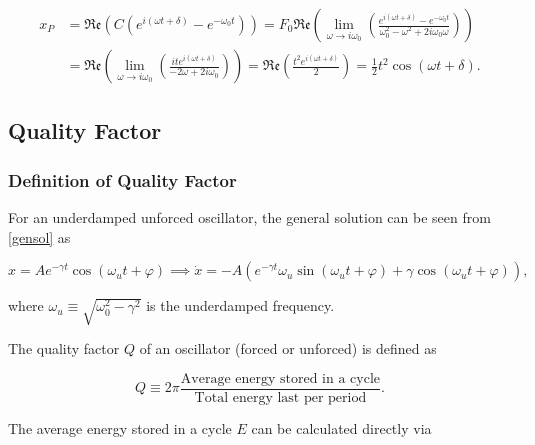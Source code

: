 \documentclass[english,a4paper,12pt]{report}
\begin{document}
\begin{equation}
    \begin{aligned} 
    x_{P} &= \mathfrak{Re} (C(e^{i(\omega t+\delta )} - e^{-\omega _{0}t } )) = F_0 \mathfrak{Re} \left( \lim_{\omega  \to i\omega _{0} } \left( \frac{e^{i(\omega t+\delta )}-e^{-\omega _{0}t }  }{\omega _{0}^2-\omega ^2+2i\omega _{0}\omega  }  \right) \right) \\ &= \mathfrak{Re} \left( \lim_{\omega  \to i\omega _{0} } \left( \frac{ite^{i(\omega t+\delta )} }{-2\omega + 2i\omega _{0} }  \right) \right) = \mathfrak{Re} \left( \frac{t^2 e^{i(\omega t+\delta )} }{2}  \right) = \frac{1}{2}t^2\cos (\omega t+\delta ). 
    \end{aligned} 
\end{equation}



\subsection{Quality Factor}

\subsubsection{Definition of Quality Factor}

For an underdamped unforced oscillator, the general solution can be seen from \cref{gensol} as

\begin{equation}
    x = Ae^{-\gamma t} \cos (\omega _{u} t+\varphi ) \implies \dot{x} = -A\left( e^{-\gamma t} \omega _{u}\sin (\omega _{u}t+\varphi  ) + \gamma \cos (\omega _{u}t+\varphi  )  \right), 
\end{equation}

where \(\omega _{u} \equiv \sqrt{\omega _{0}^2- \gamma ^2 } \) is the underdamped frequency.

The quality factor \(Q\) of an oscillator (forced or unforced) is defined as 

\begin{equation}
    Q \equiv 2\pi \frac{\text{Average energy stored in a cycle}}{\text{Total energy last per period}}.
\end{equation}

The average energy stored in a cycle \(E\) can be calculated directly via
\end{document}
